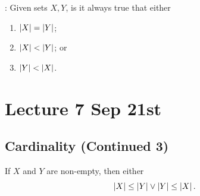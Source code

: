 \documentclass[notoc,notitlepage]{tufte-book}
\begin{document}
: Given sets $X, Y$, is it always true that either
\begin{enumerate}
  \item $\left|X\right| = \left|Y\right|$;
  \item $\left|X\right| < \left|Y\right|$; or
  \item $\left|Y\right| < \left|X\right|$.
\end{enumerate}



\chapter{Lecture 7 Sep 21st}%
\label{chp:lecture_7_sep_21st}

\section{Cardinality (Continued 3)}%
\label{sec:cardinality_continued_3}

\begin{thm}\label{thm:comparability_of_cardinals}
  If $X$ and $Y$ are non-empty, then either
  \begin{equation*}
    \left|X\right| \leq \left|Y\right| \lor \left|Y\right| \leq \left|X\right|.
  \end{equation*}
\end{thm}
\end{document}
